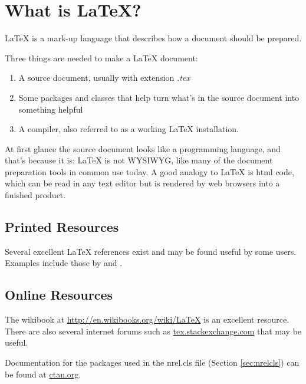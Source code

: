 \section{What is LaTeX?}
LaTeX is a mark-up language that describes how a document should be prepared.

Three things are needed to make a LaTeX document:
\begin{enumerate}
\item A source document, usually with extension \emph{.tex}
\item Some packages and classes that help turn what's in the source document into something helpful
\item A compiler, also referred to as a working LaTeX installation.
\end{enumerate}

At first glance the source document looks like a programming language, and that's because it is: LaTeX is not WYSIWYG, like many of the document preparation tools in common use today. A good analogy to LaTeX is html code, which can be read in any text editor but is rendered by web browsers into a finished product.

\subsection{Printed Resources}
Several excellent LaTeX references exist and may be found useful by some users. Examples include those by \citet{Knuth_1984_a} and \citet{Lamport_1986_a}.

\subsection{Online Resources}
The wikibook at \href{http://en.wikibooks.org/wiki/LaTeX}{http://en.wikibooks.org/wiki/LaTeX} is an excellent resource. There are also several internet forums such as \href{tex.stackexchange.com}{tex.stackexchange.com} that may be useful.

Documentation for the packages used in the nrel.cls file (Section \ref{sec:nrelcls}) can be found at \href{ctan.org}{ctan.org}.
